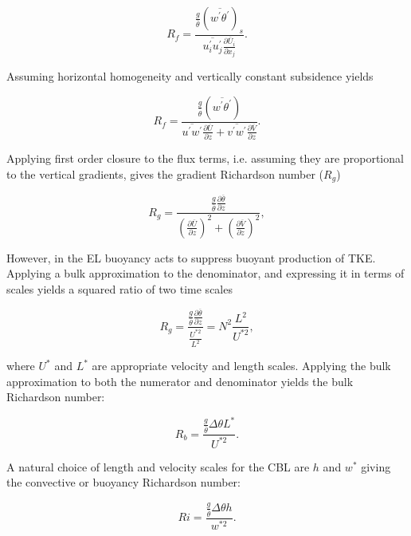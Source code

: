 \begin{equation}
R_{f} = \frac{\frac{g}{\overline{\theta}}( \overline{w^{'}\theta^{'}})_{s}}{\overline{u_{i}^{'}u_{j}^{'}}\frac{\partial \overline{U}_{i}}{\partial x_{j}}}.
\end{equation}
 
Assuming horizontal homogeneity and vertically constant subsidence yields
  
\begin{equation}
R_{f} = \frac{\frac{g}{\overline{\theta}} \left( \overline{w^{'}\theta^{'}} \right)}{\overline{u^{'}w^{'}}\frac{\partial \overline{U}}{\partial z} + \overline{v^{'}w^{'}}\frac{\partial \overline{V}}{\partial z}}.
\end{equation}

Applying first order closure to the flux terms, i.e. assuming they are proportional to the vertical gradients, gives the gradient Richardson number ($R_{g}$)

\begin{equation}
R_{g} = \frac{ \frac{g}{\overline{\theta}} \frac{\partial \overline{\theta}}{\partial z}}{\left( \frac{ \partial \overline{U}}{\partial z} \right)^{2} + \left( \frac{\partial \overline{V}}{\partial z} \right)^{2}}, 
\end{equation}

However, in the \acs{EL} buoyancy acts to suppress buoyant production of \acs{TKE}.  Applying a bulk approximation to the denominator, and expressing it in terms of scales yields a squared ratio of two time scales

\begin{equation}
R_{g} = \frac{\frac{g}{\overline{\theta}} \frac{\partial \overline{\theta}}{\partial z}}{\frac{U^{*2}}{L^{2}}} = N^{2}\frac{L^{2}}{U^{*2}},
\end{equation}

where $U^{*}$ and $L^{*}$ are appropriate velocity and length scales.  Applying the bulk approximation to both the numerator and denominator yields the bulk Richardson number:

\begin{equation}
R_{b} = \frac{\frac{g}{\overline{\theta}} \Delta \theta L^{*}}{U^{*2}}.
\end{equation}

A natural choice of length and velocity scales for the \acs{CBL} are $h$ and $w^{*}$ giving the convective or buoyancy Richardson number:

\begin{equation}
Ri = \frac{\frac{g}{\overline{\theta}} \Delta \theta h}{w^{*2}}.
\end{equation}

